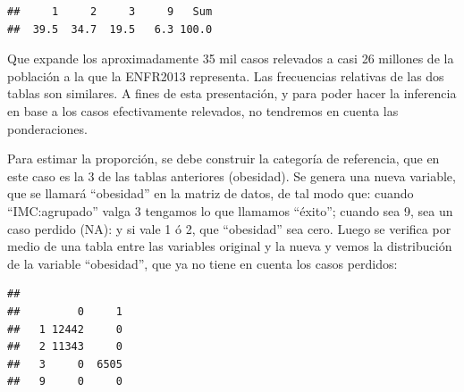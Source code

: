 \documentclass[]{book}
\newenvironment{Shaded}{\begin{snugshade}}{\end{snugshade}}
\newcommand{\DecValTok}[1]{\textcolor[rgb]{0.00,0.00,0.81}{#1}}
\newcommand{\KeywordTok}[1]{\textcolor[rgb]{0.13,0.29,0.53}{\textbf{#1}}}
\newcommand{\NormalTok}[1]{#1}
\newcommand{\OperatorTok}[1]{\textcolor[rgb]{0.81,0.36,0.00}{\textbf{#1}}}
\newcommand{\OtherTok}[1]{\textcolor[rgb]{0.56,0.35,0.01}{#1}}
\newcommand{\StringTok}[1]{\textcolor[rgb]{0.31,0.60,0.02}{#1}}
\begin{document}
\begin{verbatim}
##     1     2     3     9   Sum 
##  39.5  34.7  19.5   6.3 100.0
\end{verbatim}

Que expande los aproximadamente 35 mil casos relevados a casi 26 millones de la población a la que la ENFR2013 representa. Las frecuencias relativas de las dos tablas son similares.
A fines de esta presentación, y para poder hacer la inferencia en base a los casos efectivamente relevados, no tendremos en cuenta las ponderaciones.

Para estimar la proporción, se debe construir la categoría de referencia, que en este caso es la 3 de las tablas anteriores (obesidad). Se genera una nueva variable, que se llamará ``obesidad'' en la matriz de datos, de tal modo que: cuando ``IMC:agrupado'' valga 3 tengamos lo que llamamos ``éxito''; cuando sea 9, sea un caso perdido (NA): y si vale 1 ó 2, que ``obesidad'' sea cero. Luego se verifica por medio de una tabla entre las variables original y la nueva y vemos la distribución de la variable ``obesidad'', que ya no tiene en cuenta los casos perdidos:

\begin{Shaded}
\end{Shaded}

\begin{verbatim}
##    
##         0     1
##   1 12442     0
##   2 11343     0
##   3     0  6505
##   9     0     0
\end{verbatim}

\begin{Shaded}
\end{Shaded}
\end{document}
